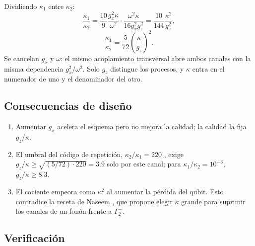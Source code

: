 \documentclass[11pt]{report}
\begin{document}
Dividiendo $\kappa_{1}$ entre $\kappa_{2}$:
\begin{equation}
\frac{\kappa_{1}}{\kappa_{2}}=\frac{10}{9}\frac{g_{x}^{2}\kappa}{\omega^{2}}\cdot\frac{\omega^{2}\kappa}{16g_{x}^{2}g_{z}^{2}}=\frac{10}{144}\frac{\kappa^{2}}{g_{z}^{2}},
\end{equation}
\begin{equation}
\boxed{\frac{\kappa_{1}}{\kappa_{2}}=\frac{5}{72}\left(\frac{\kappa}{g_{z}}\right)^{2}}.
\end{equation}
Se cancelan $g_{x}$ y $\omega$: el mismo acoplamiento transversal abre ambos canales con la misma dependencia $g_{x}^{2}/\omega^{2}$. Solo $g_{z}$ distingue los procesos, y $\kappa$ entra en el numerador de uno y el denominador del otro.

\subsection{Consecuencias de dise\~no}

\begin{enumerate}
\item Aumentar $g_{x}$ acelera el esquema pero no mejora la calidad; la calidad la fija $g_{z}/\kappa$.
\item El umbral del c\'odigo de repetici\'on, $\kappa_{2}/\kappa_{1}=220$ \cite{GuillaudMirrahimi2021}, exige $g_{z}/\kappa\geq\sqrt{(5/72)\cdot220}=3.9$ solo por este canal; para $\kappa_{1}/\kappa_{2}=10^{-3}$, $g_{z}/\kappa\geq8.3$.
\item El cociente empeora como $\kappa^{2}$ al aumentar la p\'erdida del qubit. Esto contradice la receta de Naseem \cite{Naseem2026}, que propone elegir $\kappa$ grande para suprimir los canales de un fon\'on frente a $\Gamma_{2}^{-}$.
\end{enumerate}

\subsection{Verificaci\'on}
\end{document}
